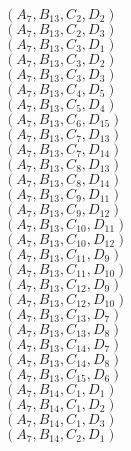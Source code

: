 \documentclass[14pt]{article}
\begin{document}
    $({A}_{7}, {B}_{13}, {C}_{2}, {D}_{2}) $ \\ 
    $({A}_{7}, {B}_{13}, {C}_{2}, {D}_{3}) $ \\ 
    $({A}_{7}, {B}_{13}, {C}_{3}, {D}_{1}) $ \\ 
    $({A}_{7}, {B}_{13}, {C}_{3}, {D}_{2}) $ \\ 
    $({A}_{7}, {B}_{13}, {C}_{3}, {D}_{3}) $ \\ 
    $({A}_{7}, {B}_{13}, {C}_{4}, {D}_{5}) $ \\ 
    $({A}_{7}, {B}_{13}, {C}_{5}, {D}_{4}) $ \\ 
    $({A}_{7}, {B}_{13}, {C}_{6}, {D}_{15}) $ \\ 
    $({A}_{7}, {B}_{13}, {C}_{7}, {D}_{13}) $ \\ 
    $({A}_{7}, {B}_{13}, {C}_{7}, {D}_{14}) $ \\ 
    $({A}_{7}, {B}_{13}, {C}_{8}, {D}_{13}) $ \\ 
    $({A}_{7}, {B}_{13}, {C}_{8}, {D}_{14}) $ \\ 
    $({A}_{7}, {B}_{13}, {C}_{9}, {D}_{11}) $ \\ 
    $({A}_{7}, {B}_{13}, {C}_{9}, {D}_{12}) $ \\ 
    $({A}_{7}, {B}_{13}, {C}_{10}, {D}_{11}) $ \\ 
    $({A}_{7}, {B}_{13}, {C}_{10}, {D}_{12}) $ \\ 
    $({A}_{7}, {B}_{13}, {C}_{11}, {D}_{9}) $ \\ 
    $({A}_{7}, {B}_{13}, {C}_{11}, {D}_{10}) $ \\ 
    $({A}_{7}, {B}_{13}, {C}_{12}, {D}_{9}) $ \\ 
    $({A}_{7}, {B}_{13}, {C}_{12}, {D}_{10}) $ \\ 
    $({A}_{7}, {B}_{13}, {C}_{13}, {D}_{7}) $ \\ 
    $({A}_{7}, {B}_{13}, {C}_{13}, {D}_{8}) $ \\ 
    $({A}_{7}, {B}_{13}, {C}_{14}, {D}_{7}) $ \\ 
    $({A}_{7}, {B}_{13}, {C}_{14}, {D}_{8}) $ \\ 
    $({A}_{7}, {B}_{13}, {C}_{15}, {D}_{6}) $ \\ 
    $({A}_{7}, {B}_{14}, {C}_{1}, {D}_{1}) $ \\ 
    $({A}_{7}, {B}_{14}, {C}_{1}, {D}_{2}) $ \\ 
    $({A}_{7}, {B}_{14}, {C}_{1}, {D}_{3}) $ \\ 
    $({A}_{7}, {B}_{14}, {C}_{2}, {D}_{1}) $ \\ 
\end{document}
